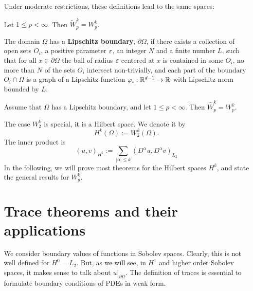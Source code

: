 Under moderate restrictions, these definitions lead to the same spaces:
\begin{theorem} Let $1 \leq p < \infty$. Then $\widetilde W_p^k  = W_p^k$.
\end{theorem}

\begin{definition} The domain $\Omega$ has a {\bf Lipschitz boundary}, $\partial \Omega$, if there exists a collection of open sets $O_i$, a positive parameter $\varepsilon$, an integer $N$ and a finite number $L$, such that for all $x \in \partial \Omega$ the ball of radius $\varepsilon$ centered at $x$ is contained in some $O_i$, no more than $N$ of the sets $O_i$ intersect non-trivially, and each 
part of the boundary $O_i \cap \Omega$ is a graph of a Lipschitz function $\varphi_i : {\mathbb R}^{d-1} \rightarrow {\mathbb R}$ with Lipschitz norm bounded by $L$.
\end{definition}

\begin{theorem} Assume that $\Omega$ has a Lipschitz boundary, and let $1 \leq p < \infty$. Then  $\widehat W_p^k  = W_p^k$.
\end{theorem}


The case $W_2^k$ is special, it is a Hilbert space. We denote it by
$$
H^k(\Omega) := W_2^k(\Omega).
$$
The inner product is 
$$
(u,v)_{H^k} := \sum_{|\alpha| \leq k} (D^\alpha u, D^\alpha v)_{L_2}
$$
In the following, we will prove most theorems for the Hilbert spaces $H^k$,
and state the general results for $W_p^k$.

\section{Trace theorems and their applications}
We consider boundary values of functions in Sobolev spaces. Clearly,
this is not well defined for $H^0 = L_2$. But, as we will see, in
$H^1$ and higher order Sobolev spaces, it makes sense to talk about $u
|_{\partial \Omega}$. The definition of traces is essential to
formulate boundary conditions of PDEs in weak form.


